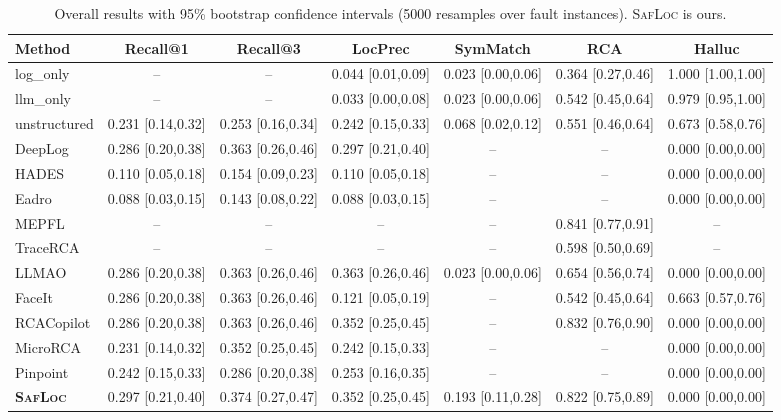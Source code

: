 \begin{table}[t]
  \centering
  \caption{Overall results with 95\% bootstrap confidence intervals (5000 resamples over fault instances). \textsc{SafLoc} is ours.}
  \label{tab:results_ci}
  \setlength{\tabcolsep}{3pt}
  \footnotesize
  \begin{tabular}{lcccccc}
    \toprule
    Method & Recall@1 & Recall@3 & LocPrec & SymMatch & RCA & Halluc \\
    \midrule
    log\_only & -- & -- & 0.044 [0.01,0.09] & 0.023 [0.00,0.06] & 0.364 [0.27,0.46] & 1.000 [1.00,1.00] \\
    llm\_only & -- & -- & 0.033 [0.00,0.08] & 0.023 [0.00,0.06] & 0.542 [0.45,0.64] & 0.979 [0.95,1.00] \\
    unstructured & 0.231 [0.14,0.32] & 0.253 [0.16,0.34] & 0.242 [0.15,0.33] & 0.068 [0.02,0.12] & 0.551 [0.46,0.64] & 0.673 [0.58,0.76] \\
    DeepLog & 0.286 [0.20,0.38] & 0.363 [0.26,0.46] & 0.297 [0.21,0.40] & -- & -- & 0.000 [0.00,0.00] \\
    HADES & 0.110 [0.05,0.18] & 0.154 [0.09,0.23] & 0.110 [0.05,0.18] & -- & -- & 0.000 [0.00,0.00] \\
    Eadro & 0.088 [0.03,0.15] & 0.143 [0.08,0.22] & 0.088 [0.03,0.15] & -- & -- & 0.000 [0.00,0.00] \\
    MEPFL & -- & -- & -- & -- & 0.841 [0.77,0.91] & -- \\
    TraceRCA & -- & -- & -- & -- & 0.598 [0.50,0.69] & -- \\
    LLMAO & 0.286 [0.20,0.38] & 0.363 [0.26,0.46] & 0.363 [0.26,0.46] & 0.023 [0.00,0.06] & 0.654 [0.56,0.74] & 0.000 [0.00,0.00] \\
    FaceIt & 0.286 [0.20,0.38] & 0.363 [0.26,0.46] & 0.121 [0.05,0.19] & -- & 0.542 [0.45,0.64] & 0.663 [0.57,0.76] \\
    RCACopilot & 0.286 [0.20,0.38] & 0.363 [0.26,0.46] & 0.352 [0.25,0.45] & -- & 0.832 [0.76,0.90] & 0.000 [0.00,0.00] \\
    MicroRCA & 0.231 [0.14,0.32] & 0.352 [0.25,0.45] & 0.242 [0.15,0.33] & -- & -- & 0.000 [0.00,0.00] \\
    Pinpoint & 0.242 [0.15,0.33] & 0.286 [0.20,0.38] & 0.253 [0.16,0.35] & -- & -- & 0.000 [0.00,0.00] \\
    \midrule
    \textbf{\textsc{SafLoc}} & 0.297 [0.21,0.40] & 0.374 [0.27,0.47] & 0.352 [0.25,0.45] & 0.193 [0.11,0.28] & 0.822 [0.75,0.89] & 0.000 [0.00,0.00] \\
    \bottomrule
  \end{tabular}
\end{table}

